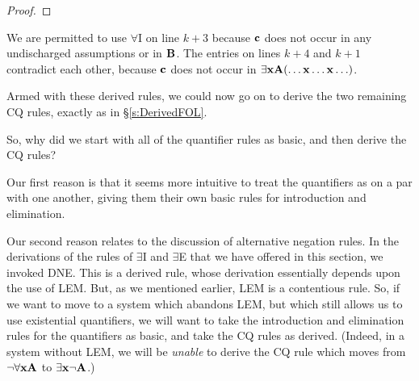 \begin{proof}
	\open
	\close
	\open
	\close
\end{proof}\noindent
We are permitted to use $\forall$I on line $k+3$ because $\mathbf{c}$ does not occur in any  undischarged assumptions or in $\mathbf{B}$. The entries on lines $k+4$ and $k+1$ contradict each other, because $\mathbf{c}$ does not occur in $\exists \mathbf{x} \mathbf{A}(\ldots \mathbf{x} \ldots \mathbf{x} \ldots)$.

Armed with these derived rules, we could now go on to derive the two remaining CQ rules, exactly as in \S\ref{s:DerivedFOL}.

So, why did we start with all of the quantifier rules as basic, and then derive the CQ rules? 

Our first reason is that it seems more intuitive to treat the quantifiers as on a par with one another, giving them their own basic rules for introduction and elimination. 

Our second reason relates to the discussion of alternative negation rules. In the derivations of the rules of $\exists$I and $\exists$E that we have offered in this section, we invoked DNE. This is a derived rule, whose derivation essentially depends upon the use of LEM. But, as we mentioned earlier, LEM is a contentious rule. So, if we want to move to a system which abandons LEM, but which still allows us to use existential quantifiers, we will want to take the introduction and elimination rules for the quantifiers as basic, and take the CQ rules as derived. (Indeed, in a system without LEM, we will be \emph{unable} to derive the CQ rule which moves from $\neg \forall \mathbf{x} \mathbf{A}$ to $\exists \mathbf{x} \neg \mathbf{A}$.)
